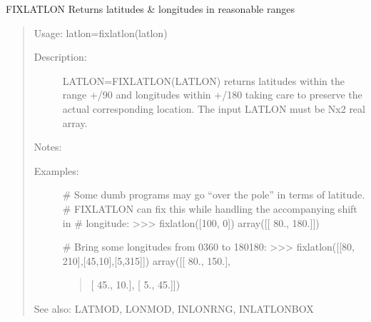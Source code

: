 \documentclass[letterpaper,10pt,english]{sphinxmanual}
\begin{document}
\begin{fulllineitems}
\label{\detokenize{infrapy.utils:infrapy.utils.latlon.fixlatlon}}
FIXLATLON    Returns latitudes \& longitudes in reasonable ranges
\begin{quote}

Usage:    latlon=fixlatlon(latlon)
\begin{description}
\item[{Description:}] \leavevmode
LATLON=FIXLATLON(LATLON) returns latitudes within the range +/\sphinxhyphen{}90
and longitudes within +/\sphinxhyphen{}180 taking care to preserve the actual
corresponding location.  The input LATLON must be Nx2 real array.

\end{description}

Notes:
\begin{description}
\item[{Examples:}] \leavevmode
\# Some dumb programs may go “over the pole” in terms of latitude.
\# FIXLATLON can fix this while handling the accompanying shift in
\# longitude:
\textgreater{}\textgreater{}\textgreater{} fixlatlon({[}100, 0{]})
array({[}{[}  80.,  180.{]}{]})

\# Bring some longitudes from 0\sphinxhyphen{}360 to \sphinxhyphen{}180\sphinxhyphen{}180:
\textgreater{}\textgreater{}\textgreater{} fixlatlon({[}{[}80, 210{]},{[}\sphinxhyphen{}45,10{]},{[}\sphinxhyphen{}5,315{]}{]})
array({[}{[}  80., \sphinxhyphen{}150.{]},
\begin{quote}

{[} \sphinxhyphen{}45.,   10.{]},
{[}  \sphinxhyphen{}5.,  \sphinxhyphen{}45.{]}{]})
\end{quote}

\end{description}

See also: LATMOD, LONMOD, INLONRNG, INLATLONBOX
\end{quote}

\end{fulllineitems}

\end{document}
